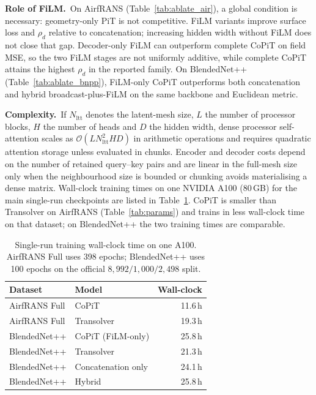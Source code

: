 \documentclass[final,3p,times]{elsarticle}
\begin{document}
\noindent\textbf{Role of FiLM.}\ 
On AirfRANS (Table~\ref{tab:ablate_air}), a global condition is necessary: geometry-only PiT is not competitive. FiLM variants improve surface loss and $\rho_d$ relative to concatenation; increasing hidden width without FiLM does not close that gap. Decoder-only FiLM can outperform complete CoPiT on field MSE, so the two FiLM stages are not uniformly additive, while complete CoPiT attains the highest $\rho_d$ in the reported family. On BlendedNet++ (Table~\ref{tab:ablate_bnpp}), FiLM-only CoPiT outperforms both concatenation and hybrid broadcast-plus-FiLM on the same backbone and Euclidean metric.

\noindent\textbf{Complexity.}\ 
If $N_{\mathrm{ltt}}$ denotes the latent-mesh size, $L$ the number of processor blocks, $H$ the number of heads and $D$ the hidden width, dense processor self-attention scales as $\mathcal{O}(L N_{\mathrm{ltt}}^{2} H D)$ in arithmetic operations and requires quadratic attention storage unless evaluated in chunks. Encoder and decoder costs depend on the number of retained query--key pairs and are linear in the full-mesh size only when the neighbourhood size is bounded or chunking avoids materialising a dense matrix. Wall-clock training times on one NVIDIA A100 (80\,GB) for the main single-run checkpoints are listed in Table~\ref{tab:runtime}. CoPiT is smaller than Transolver on AirfRANS (Table~\ref{tab:params}) and trains in less wall-clock time on that dataset; on BlendedNet++ the two training times are comparable.

\begin{table}[ht]
\caption{Single-run training wall-clock time on one A100. AirfRANS Full uses 398 epochs; BlendedNet++ uses 100 epochs on the official $8{,}992/1{,}000/2{,}498$ split.}
\label{tab:runtime}
\centering\footnotesize
\begin{tabular}{@{}llr@{}}
\toprule
Dataset & Model & Wall-clock \\
\midrule
AirfRANS Full & CoPiT & 11.6\,h \\
AirfRANS Full & Transolver & 19.3\,h \\
BlendedNet++ & CoPiT (FiLM-only) & 25.8\,h \\
BlendedNet++ & Transolver & 21.3\,h \\
BlendedNet++ & Concatenation only & 24.1\,h \\
BlendedNet++ & Hybrid & 25.8\,h \\
\bottomrule
\end{tabular}
\end{table}
\end{document}
